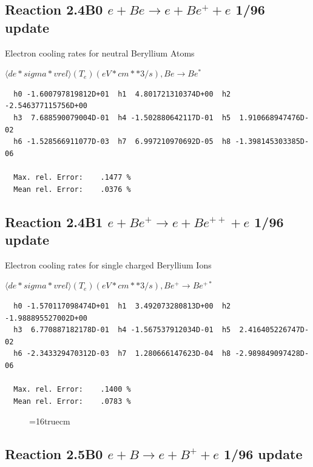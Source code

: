 \documentclass[12pt,dvips]{article}
\begin{document}
\subsection{
Reaction 2.4B0 $e + Be \rightarrow e + Be^+ + e $ 1/96 update
}

  Electron cooling rates for neutral
  Beryllium Atoms

 $ \langle de*sigma*vrel \rangle(T_e)  (eV*cm**3/s), Be  \rightarrow Be^*$

\begin{small}\begin{verbatim}
  h0 -1.600797819812D+01  h1  4.801721310374D+00  h2 -2.546377115756D+00
  h3  7.688590079004D-01  h4 -1.502880642117D-01  h5  1.910668947476D-02
  h6 -1.528566911077D-03  h7  6.997210970692D-05  h8 -1.398145303385D-06

  Max. rel. Error:    .1477 %
  Mean rel. Error:    .0376 %

\end{verbatim}\end{small}


\subsection{
Reaction 2.4B1 $e + Be^+ \rightarrow e + Be^{++} + e $ 1/96 update
}

  Electron cooling rates for single
  charged Beryllium Ions

 $ \langle de*sigma*vrel \rangle(T_e)  (eV*cm**3/s), Be^+ \rightarrow Be^{+*} $

\begin{small}\begin{verbatim}
  h0 -1.570117098474D+01  h1  3.492073280813D+00  h2 -1.988895527002D+00
  h3  6.770887182178D-01  h4 -1.567537912034D-01  h5  2.416405226747D-02
  h6 -2.343329470312D-03  h7  1.280666147623D-04  h8 -2.989849097428D-06

  Max. rel. Error:    .1400 %
  Mean rel. Error:    .0783 %

\end{verbatim}\end{small}

\begin{figure} \label{2.4Bl}
\epsfxsize=16truecm
\end{figure}
\newpage

\subsection{
Reaction 2.5B0 $e + B \rightarrow e + B^+ + e $ 1/96 update
}
\end{document}

